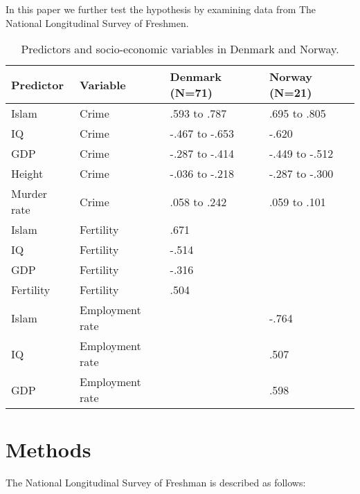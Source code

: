 \documentclass[a4paper,12pt]{article}
\begin{document}
In this paper we further test the hypothesis by examining data from The National Longitudinal Survey of Freshmen.

\begin{table}[H]
\centering
\begin{tabular}{|l|l|l|l|}
\hline
\textbf{Predictor} & \textbf{Variable} & \textbf{Denmark (N=71)} & \textbf{Norway (N=21)} \\ \hline
Islam              & Crime             & .593 to .787            & .695 to .805           \\ \hline
IQ                 & Crime             & -.467 to -.653          & -.620                  \\ \hline
GDP                & Crime             & -.287 to -.414          & -.449 to -.512         \\ \hline
Height             & Crime             & -.036 to -.218          & -.287 to -.300         \\ \hline
Murder rate        & Crime             & .058 to .242            & .059 to .101           \\ \hline
Islam              & Fertility         & .671                    &                        \\ \hline
IQ                 & Fertility         & -.514                   &                        \\ \hline
GDP                & Fertility         & -.316                   &                        \\ \hline
Fertility          & Fertility         & .504                    &                        \\ \hline
Islam              & Employment rate   &                         & -.764                  \\ \hline
IQ                 & Employment rate   &                         & .507                   \\ \hline
GDP                & Employment rate   &                         & .598                   \\ \hline
\end{tabular}
\caption{Predictors and socio-economic variables in Denmark and Norway.}\label{kirkegaardresults}
\end{table}

\section{Methods}
The National Longitudinal Survey of Freshman is described as follows\cite{NLSF}:
\end{document}
